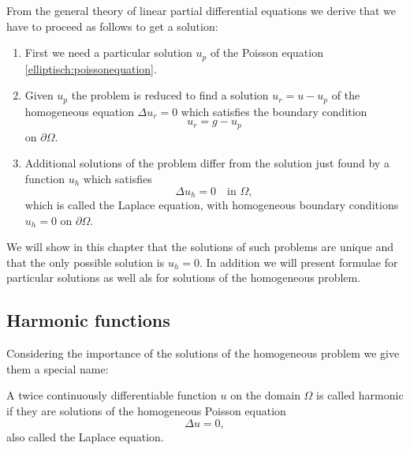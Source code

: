 From the general theory of linear partial differential equations
we derive that we have to proceed as follows to get a solution:
\begin{enumerate}
\item
First we need a particular solution $u_p$ of the Poisson equation
\eqref{elliptisch:poissonequation}.
\item
Given $u_p$ the problem is reduced to find a solution
$u_r=u-u_p$ of the homogeneous equation $\Delta u_r=0$ which
satisfies the boundary condition
\[
u_r=g-u_p
\]
on $\partial\Omega$.
\item
Additional solutions of the problem differ from the solution
just found by a function $u_h$ which satisfies
\begin{equation}
\Delta u_h=0 \quad \text{in $\Omega$},
\label{elliptisch:laplacequation}
\end{equation}
which is called the Laplace equation,
with homogeneous boundary conditions $u_h=0$ on $\partial\Omega$.
\end{enumerate}
We will show in this chapter that the solutions of such problems
are unique and that the only possible solution is $u_h=0$.
In addition we will present formulae for particular solutions as well
als for solutions of the homogeneous problem.

\subsection{Harmonic functions}
Considering the importance of the solutions of the homogeneous problem
we give them a special name:

\begin{definition}
A twice continuously differentiable function $u$ on the domain $\Omega$
is called harmonic if they are solutions of the homogeneous Poisson
equation
\[
\Delta u=0,
\]
also called the Laplace equation.
\end{definition}

